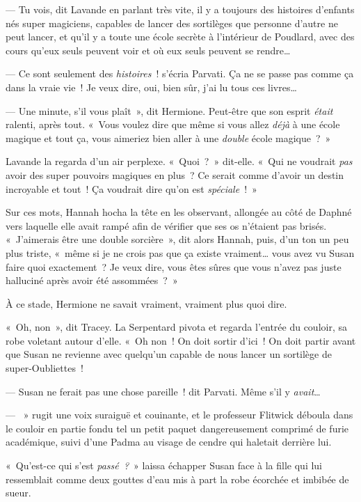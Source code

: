 --- Tu vois, dit Lavande en parlant très vite, il y a toujours des histoires d'enfants nés super magiciens, capables de lancer des sortilèges que personne d'autre ne peut lancer, et qu'il y a toute une école secrète à l'intérieur de Poudlard, avec des cours qu'eux seuls peuvent voir et où eux seuls peuvent se rendre…

--- Ce sont seulement des \emph{histoires}~! s'écria Parvati.
Ça ne se passe pas comme ça dans la vraie vie~!
Je veux dire, oui, bien sûr, j'ai lu tous ces livres…

--- Une minute, s'il vous plaît~», dit Hermione.
Peut-être que son esprit \emph{était} ralenti, après tout.
«~Vous voulez dire que même si vous allez \emph{déjà} à une école magique et tout ça, vous aimeriez bien aller à une \emph{double} école magique~?~»

Lavande la regarda d'un air perplexe.
«~Quoi~?~»
dit-elle.
«~Qui ne voudrait \emph{pas} avoir des super pouvoirs magiques en plus~?
Ce serait comme d'avoir un destin incroyable et tout~!
Ça voudrait dire qu'on est \emph{spéciale}~!~»

Sur ces mots, Hannah hocha la tête en les observant, allongée au côté de Daphné vers laquelle elle avait rampé afin de vérifier que ses os n'étaient pas brisés.
«~J'aimerais être une double sorcière~», dit alors Hannah, puis, d'un ton un peu plus triste, «~même si je ne crois pas que ça existe vraiment… vous avez vu Susan faire quoi exactement~?
Je veux dire, vous êtes sûres que vous n'avez pas juste halluciné après avoir été assommées~?~»

À ce stade, Hermione ne savait vraiment, vraiment plus quoi dire.

«~Oh, non~», dit Tracey.
La Serpentard pivota et regarda l'entrée du couloir, sa robe voletant autour d'elle.
«~Oh non~!
On doit sortir d'ici~!
On doit partir avant que Susan ne revienne avec quelqu'un capable de nous lancer un sortilège de super-Oubliettes~!

--- Susan ne ferait pas une chose pareille~! dit Parvati.
Même s'il y \emph{avait}…

--- ~» rugit une voix suraiguë et couinante, et le professeur Flitwick déboula dans le couloir en partie fondu tel un petit paquet dangereusement comprimé de furie académique, suivi d'une Padma au visage de cendre qui haletait derrière lui.

\later

«~Qu'est-ce qui s'est \emph{passé~?}~» laissa échapper Susan face à la fille qui lui ressemblait comme deux gouttes d'eau mis à part la robe écorchée et imbibée de sueur.

